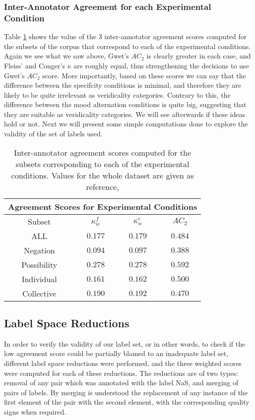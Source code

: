 \subsubsection{Inter-Annotator Agreement for each Experimental Condition}
\label{subsubsec:expiaa}
Table \ref{tab:pilexpiaa} shows the value of the 3 inter-annotator agreement scores computed for the subsets of the corpus that correspond to each of the experimental conditions. Again we see what we saw above, Gwet's $AC_2$ is clearly greater in each case, and Fleiss' and Conger's $\kappa$ are roughly equal, thus strengthening the decisions to use Gwet's $AC_2$ score. More importantly, based on these scores we can say that the difference between the specifcity conditions is minimal, and therefore they are likely to be quite irrelevant as veridicality categories. Contrary to this, the difference between the mood alternation conditions is quite big, suggesting that they are suitable as veridicality categories. We will see afterwards if these ideas hold or not. Next we will present some simple computations done to explore the validity of the set of labels used.\\
\begin{table}
\centering
\begin{tabular}{|c|c|c|c|}
\hline
\multicolumn{4}{|c|}{Agreement Scores for Experimental Conditions}\\\hline
Subset &  $\kappa^{f}_{w}$ & $\kappa^{c}_{w}$ & $AC_2$\\\hline
ALL & $0.177$ & $0.179$ & $0.484$\\\hline
Negation & $0.094$ & $0.097$ & $0.388$\\\hline
Possibility & $0.278$ & $0.278$ & $0.592$\\\hline
Individual & $0.161$ & $0.162$ & $0.500$\\\hline
Collective & $0.190$ & $0.192$ & $0.470$\\\hline
\end{tabular}
\caption[Inter-annotator agreement scores for experimental conditions.]{Inter-annotator agreement scores computed for the subsets corresponding to each of the experimental conditions. Values for the whole dataset are given as reference,}
\label{tab:pilexpiaa}
\end{table}

\subsection{Label Space Reductions}
In order to verify the validity of our label set, or in other words, to check if the low agreement score could be partially blamed to an inadequate label set, different label space reductions were performed, and the three weighted scores were computed for each of these reductions. The reductions are of two types: removal of any pair which was annotated with the label NaS, and merging of pairs of labels. By merging is understood the replacement of any instance of the first element of the pair with the second element, with the corresponding quality signs when required.\\


